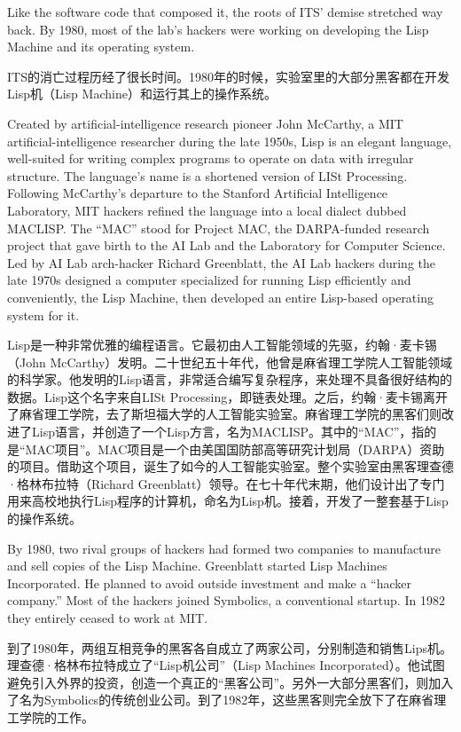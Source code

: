 \ifdefined\eng
Like the software code that composed it, the roots of ITS' demise stretched way back.  By 1980, most of the lab's hackers were working on developing the Lisp Machine and its operating system.
\fi

\ifdefined\chs
ITS的消亡过程历经了很长时间。1980年的时候，实验室里的大部分黑客都在开发Lisp机（Lisp Machine）和运行其上的操作系统。
\fi

\ifdefined\eng
Created by artificial-intelligence research pioneer John McCarthy, a MIT artificial-intelligence researcher during the late 1950s, Lisp is an elegant language, well-suited for writing complex programs to operate on data with irregular structure. The language's name is a shortened version of LISt Processing. Following McCarthy's departure to the Stanford Artificial Intelligence Laboratory, MIT hackers refined the language into a local dialect dubbed MACLISP. The ``MAC'' stood for Project MAC, the DARPA-funded research project that gave birth to the AI Lab and the Laboratory for Computer Science. Led by AI Lab arch-hacker Richard Greenblatt, the AI Lab hackers during the late 1970s designed a computer specialized for running Lisp efficiently and conveniently, the Lisp Machine, then developed an entire Lisp-based operating system for it.
\fi

\ifdefined\chs
Lisp是一种非常优雅的编程语言。它最初由人工智能领域的先驱，约翰·麦卡锡（John McCarthy）发明。二十世纪五十年代，他曾是麻省理工学院人工智能领域的科学家。他发明的Lisp语言，非常适合编写复杂程序，来处理不具备很好结构的数据。Lisp这个名字来自LISt Processing，即链表处理。之后，约翰·麦卡锡离开了麻省理工学院，去了斯坦福大学的人工智能实验室。麻省理工学院的黑客们则改进了Lisp语言，并创造了一个Lisp方言，名为MACLISP。其中的``MAC''，指的是``MAC项目''。MAC项目是一个由美国国防部高等研究计划局（DARPA）资助的项目。借助这个项目，诞生了如今的人工智能实验室。整个实验室由黑客理查德·格林布拉特（Richard Greenblatt）领导。在七十年代末期，他们设计出了专门用来高校地执行Lisp程序的计算机，命名为Lisp机。接着，开发了一整套基于Lisp的操作系统。
\fi

\ifdefined\eng
By 1980, two rival groups of hackers had formed two companies to manufacture and sell copies of the Lisp Machine.  Greenblatt started Lisp Machines Incorporated.  He planned to avoid outside investment and make a ``hacker company.''  Most of the hackers joined Symbolics, a conventional startup.  In 1982 they entirely ceased to work at MIT.
\fi

\ifdefined\chs
到了1980年，两组互相竞争的黑客各自成立了两家公司，分别制造和销售Lips机。理查德·格林布拉特成立了``Lisp机公司''（Lisp Machines Incorporated）。他试图避免引入外界的投资，创造一个真正的``黑客公司''。另外一大部分黑客们，则加入了名为Symbolics的传统创业公司。到了1982年，这些黑客则完全放下了在麻省理工学院的工作。
\fi

